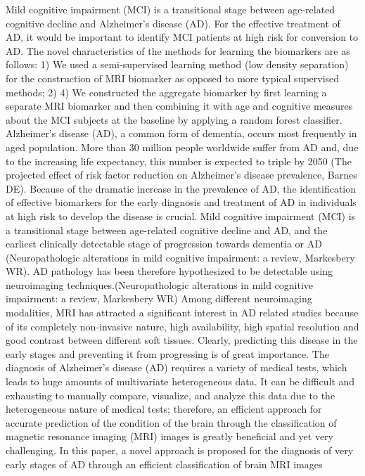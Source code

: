 \iffalse
Mild cognitive impairment (MCI) is a transitional stage between age-related cognitive decline and Alzheimer’s disease (AD). For the effective treatment of AD, it would be important to identify MCI patients at high risk for conversion to AD. 
The novel characteristics of the methods for learning the biomarkers are as follows: 1) We used a semi-supervised learning method (low density separation) for the construction of MRI biomarker as opposed to more typical supervised methods; 2)
4) We constructed the aggregate biomarker by first learning a separate MRI biomarker and then combining it with age and cognitive measures about the MCI subjects at the baseline by applying a random forest classifier.
Alzheimer’s disease (AD), a common form of dementia, occurs most frequently in aged population. More than 30 million people worldwide suffer from AD and, due to the increasing life expectancy, this number is expected to triple by 2050 (The projected effect of risk factor reduction on Alzheimer's disease prevalence, Barnes DE).
Because of the dramatic increase in the prevalence of AD, the identification of effective biomarkers for the early diagnosis and treatment of AD in individuals at high risk to develop the disease is crucial.
Mild cognitive impairment (MCI) is a transitional stage between age-related cognitive decline and AD, and the earliest clinically detectable stage of progression towards dementia or AD (Neuropathologic alterations in mild cognitive impairment: a review, Markesbery WR). 
AD pathology has been therefore hypothesized to be detectable using neuroimaging techniques.(Neuropathologic alterations in mild cognitive impairment: a review, Markesbery WR)
Among different neuroimaging modalities, MRI has attracted a significant interest in AD related studies because of its completely non-invasive nature, high availability, high spatial resolution and good contrast between different soft tissues.
Clearly, predicting this disease in the early stages and preventing it from progressing is of great importance.
The diagnosis of Alzheimer’s disease (AD) requires a variety of medical tests, which leads to huge amounts of multivariate heterogeneous data. It can be difficult and exhausting to manually compare, visualize, and analyze this data due to the heterogeneous nature of medical tests; therefore, an efficient approach for accurate prediction of the condition of the brain through the classification of magnetic resonance imaging (MRI) images is greatly beneficial and yet very challenging. In this paper, a novel approach is proposed for the diagnosis of very early stages of AD through an efficient classification of brain MRI images
